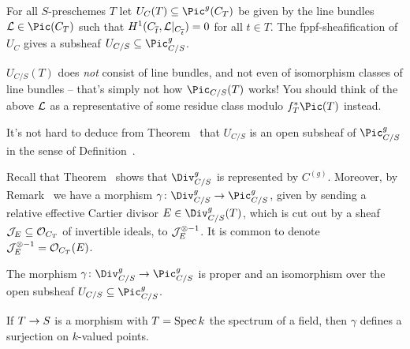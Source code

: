 \documentclass[a4paper,parskip=half,numbers=enddot, DIV=12]{scrreprt}
\begin{document}
\begin{defi}
	For all $S$-preschemes $T$ let $U_C(T)\subseteq \Pic^g(C_T)$ be given by the line bundles $\Ll\in\Pic(C_T)$ such that $H^1(C_{\overline{t}},\mathcal{L}|_{C_{\overline{t}}})=0$ for all $t\in T$. The fppf-sheafification of $U_C$ gives a subsheaf $U_{C/S}\subseteq \Pic_{C/S}^g$.
\end{defi}
\begin{rem}
	\begin{alphanumerate}
		\item $U_{C/S}(T)$ does \emph{not} consist of line bundles, and not even of isomorphism classes of line bundles -- that's simply not how $\Pic_{C/S}(T)$ works! You should think of the above $\mathcal{L}$ as a representative of some residue class modulo $f_T^*\Pic(T)$ instead.
		\item It's not hard to deduce from Theorem~ that $U_{C/S}$ is an open subsheaf of $\Pic_{C/S}^g$ in the sense of Definition~.
	\end{alphanumerate}
\end{rem}
Recall that Theorem~ shows that $\Div_{C/S}^g$ is represented by $C^{(g)}$. Moreover, by Remark~ we have a morphism $\gamma\colon\Div_{C/S}^g\morphism\Pic_{C/S}^g$, given by sending a relative effective Cartier divisor $E\in\Div_{C/S}^g(T)$, which is cut out by a sheaf $\mathcal{J}_E\subseteq \mathcal{O}_{C_T}$ of invertible ideals, to $\mathcal{J}_E^{\otimes -1}$. It is common to denote $\mathcal{J}_E^{\otimes -1}=\mathcal{O}_{C_T}(E)$.
\begin{prop}
	\begin{alphanumerate}
		\item {}The morphism $\gamma\colon\Div_{C/S}^g\morphism\Pic_{C/S}^g$ is proper and an isomorphism over the open subsheaf $U_{C/S}\subseteq \Pic_{C/S}^g$.
		\item If $T\morphism S$ is a morphism with $T=\operatorname{Spec} k$ the spectrum of a field, then $\gamma$ defines a surjection on $k$-valued points.
	\end{alphanumerate}
 \end{prop}
\end{document}
